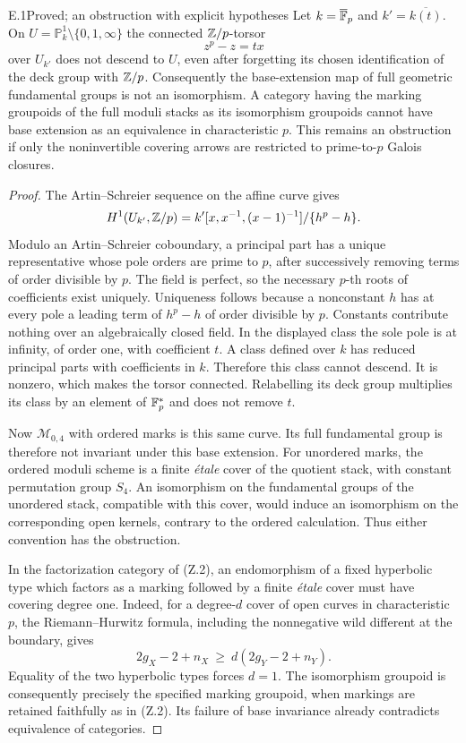 \begin{claim}{E.1}{Proved; an obstruction with explicit hypotheses}
Let $k=\overline{\mathbb F}_p$ and $k'=\overline{k(t)}$. On
$U=\mathbb P^1_k\setminus\{0,1,\infty\}$ the connected
$\mathbb Z/p$-torsor
\[
                       z^p-z=tx
\]
over $U_{k'}$ does not descend to $U$, even after forgetting its
chosen identification of the deck group with $\mathbb Z/p$.
Consequently the base-extension map of full geometric fundamental
groups is not an isomorphism. A category having the marking
groupoids of the full moduli stacks as its isomorphism groupoids
cannot have base extension as an equivalence in characteristic $p$.
This remains an obstruction if only the noninvertible covering
arrows are restricted to prime-to-$p$ Galois closures.
\end{claim}
\begin{proof}
The Artin--Schreier sequence on the affine curve gives
\[
H^1(U_{k'},\mathbb Z/p)=
k'[x,x^{-1},(x-1)^{-1}]/\{h^p-h\}.
\]
Modulo an Artin--Schreier coboundary, a principal part has a unique
representative whose pole orders are prime to $p$, after successively
removing terms of order divisible by $p$. The field is perfect, so
the necessary $p$-th roots of coefficients exist uniquely. Uniqueness
follows because a nonconstant $h$ has at every pole a leading term
of $h^p-h$ of order divisible by $p$. Constants contribute nothing
over an algebraically closed field. In the displayed class the sole
pole is at infinity, of order one, with coefficient $t$. A class
defined over $k$ has reduced principal parts with coefficients in
$k$. Therefore this class cannot descend. It is nonzero, which makes
the torsor connected. Relabelling its deck group multiplies its
class by an element of $\mathbb F_p^*$ and does not remove $t$.

Now $\mathcal M_{0,4}$ with ordered marks is this same curve.
Its full fundamental group is therefore not invariant under this
base extension. For unordered marks, the ordered moduli scheme is
a finite \emph{\'etale} cover of the quotient stack, with constant
permutation group $S_4$. An isomorphism on the fundamental groups
of the unordered stack, compatible with this cover, would induce
an isomorphism on the corresponding open kernels, contrary to
the ordered calculation. Thus either convention has the obstruction.

In the factorization category of (Z.2), an endomorphism of a fixed
hyperbolic type which factors as a marking followed by a finite
\emph{\'etale} cover must have covering degree one. Indeed, for
a degree-$d$ cover of open curves in characteristic $p$, the
Riemann--Hurwitz formula, including the nonnegative wild different
at the boundary, gives
\[
        2g_X-2+n_X\ \geq\ d(2g_Y-2+n_Y).
\]
Equality of the two hyperbolic types forces $d=1$. The isomorphism
groupoid is consequently precisely the specified marking groupoid,
when markings are retained faithfully as in (Z.2). Its failure of
base invariance already contradicts equivalence of categories.


\end{proof}
